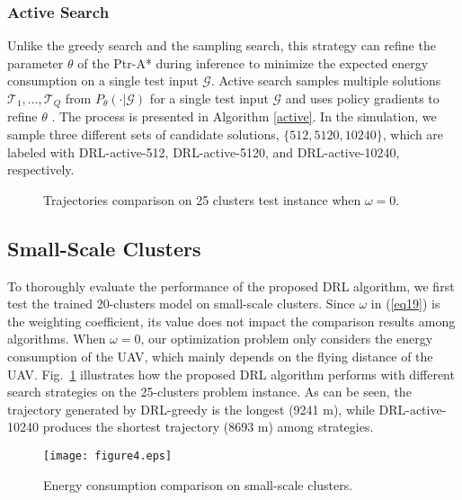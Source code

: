 \documentclass[journal]{IEEEtran}
\begin{document}
\subsubsection{Active Search}
Unlike the greedy search and the sampling search, this strategy can refine the parameter $\theta$ of the Ptr-A* during inference to minimize the expected energy consumption on a single test input $\bm{\mathcal{G}}$. Active search samples multiple solutions $\bm{\mathcal{T}}_1, \dots, \bm{\mathcal{T}}_Q$ from $ P_\theta(\cdot|\bm{\mathcal{G}})$ for a single test input $\bm{\mathcal{G}}$ and uses policy gradients to refine $\theta$ \cite{I. Bello}. The process is presented in Algorithm \ref{active}. In the simulation, we sample three different sets of candidate solutions, $\{512, 5120, 10240\}$, which are labeled with DRL-active-512, DRL-active-5120, and DRL-active-10240, respectively.



\begin{figure}[!t]
  \centering
    \hspace{0in}\hspace{0in}
	  \hspace{0in}
     \caption{Trajectories comparison on 25 clusters test instance when $\omega=0$.}
     \label{figure3}
	\vspace{0in}
\end{figure}

\subsection{Small-Scale Clusters}

To thoroughly  evaluate the performance of the proposed DRL algorithm, we first test the trained 20-clusters model on small-scale clusters. Since $\omega$ in (\ref{eq19}) is the weighting coefficient, its value does not impact the comparison results among algorithms. When $\omega = 0$, our optimization problem only considers the energy consumption of the UAV, which mainly depends on the flying distance of the UAV. Fig.~\ref{figure3} illustrates how the proposed DRL algorithm performs with different search strategies on the 25-clusters problem instance. As can be seen, the trajectory generated by DRL-greedy is the longest (9241 m), while DRL-active-10240 produces the shortest trajectory (8693 m) among strategies.

\begin{figure}[!t]
		\centering
		\texttt{[image: figure4.eps]}
		\caption{Energy consumption comparison on small-scale clusters.}
		\label{figure4}
\end{figure}
\end{document}
